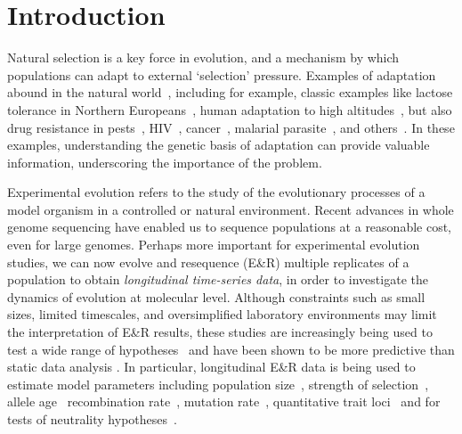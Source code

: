 \section{Introduction}
Natural selection is a key force in evolution, and a mechanism by
which populations can adapt to external `selection'
pressure. Examples of adaptation abound in the natural
world~\cite{going2016fan}, including for example, classic examples
like lactose tolerance in Northern
Europeans~\cite{bersaglieri2004genetic}, human adaptation to high
altitudes~\cite{yi2010sequencing,simonson2010genetic}, but also drug
resistance in pests~\cite{daborn2001ddt}, HIV~\cite{Feder2016More},
cancer~\cite{gottesman2002mechanisms,zahreddine2013mechanisms},
malarial parasite~\cite{ariey2014molecular,nair2007recurrent}, and
others~\cite{spellberg2008epidemic}. In these examples, understanding
the genetic basis of adaptation can provide valuable information,
underscoring the importance of the problem.


Experimental evolution refers to the study of the evolutionary
processes of a model organism in a controlled
\cite{hegreness2006equivalence,lang2013pervasive,orozco2012adaptation,
  lang2011genetic,barrick2009genome,bollback2007clonal,oz2014strength}
or natural
\cite{maldarelli2013hiv,reid2011new,denef2012situ,winters2012development,
  daniels2013genetic,barrett2008natural,bergland2014genomic}
environment. Recent advances in whole genome sequencing have enabled
us to sequence populations at a reasonable cost, even for large
genomes. Perhaps more important for experimental evolution studies, we
can now evolve and resequence (E\&R) multiple replicates of a population to
obtain \emph{longitudinal time-series data}, in order to investigate
the dynamics of evolution at molecular level.  Although constraints
such as small sizes, limited timescales, and oversimplified
laboratory environments may limit the interpretation of E\&R results,
these studies are increasingly being used to test a wide range of
hypotheses~\cite{kawecki2012experimental} and have been shown to be
more predictive than static data analysis
\cite{boyko2008assessing,desai2008polymorphism,sawyer1992population}.
In particular, longitudinal E\&R data is being used to estimate model
parameters including population
size~\cite{williamson1999using,wang2001pseudo,pollak1983new,waples1989generalized,
  Terhorst2015Multi, jonas2016estimating}, strength of
selection~\cite{mathieson2013estimating,illingworth2011distinguishing,Terhorst2015Multi,
  bollback2008estimation,illingworth2012quantifying,malaspinas2012estimating,
  steinrucken2014novel}, allele age~\cite{malaspinas2012estimating}
recombination rate~\cite{Terhorst2015Multi}, mutation
rate~\cite{Barrick2013Genome, Terhorst2015Multi}, quantitative trait
loci~\cite{baldwin2014power} and for tests of neutrality
hypotheses~\cite{feder2014Identifying,Terhorst2015Multi,burke2010genome,bergland2014genomic}.



